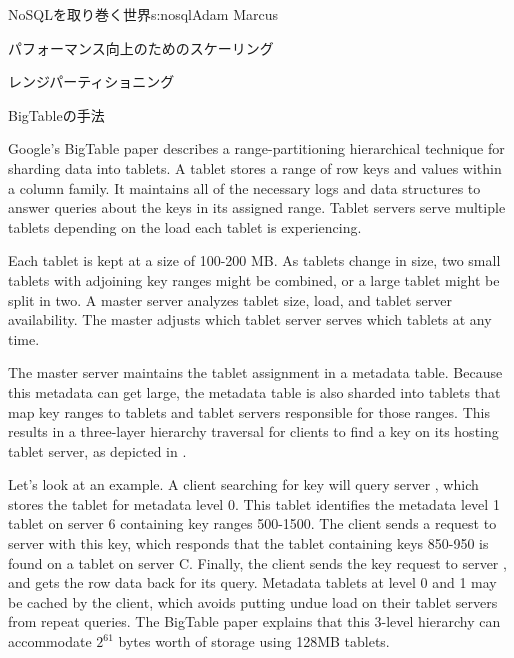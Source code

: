 \begin{aosachapter}{NoSQLを取り巻く世界}{s:nosql}{Adam Marcus}
\begin{aosasect1}{パフォーマンス向上のためのスケーリング}
\begin{aosasect2}{レンジパーティショニング}
\vspace{-0.1cm} %
\begin{aosasect3}{BigTableの手法}

Google's BigTable paper describes a range-partitioning hierarchical
technique for sharding data into tablets.  A tablet stores a range of
row keys and values within a column family.  It maintains all
of the necessary logs and data structures to answer queries about the
keys in its assigned range.  Tablet servers serve multiple tablets
depending on the load each tablet is experiencing.

Each tablet is kept at a size of 100-200 MB\@.  As tablets change in size, two 
small tablets with adjoining key ranges might be combined, or a large tablet might be
split in two.  A master server analyzes tablet size,
load, and tablet server availability.  The master adjusts which tablet
server serves which tablets at any time.


The master server maintains the tablet assignment in a metadata table.
Because this metadata can get large, the metadata table is also
sharded into tablets that map key ranges to tablets and tablet servers
responsible for those ranges.  This results in a three-layer hierarchy
traversal for clients to find a key on its hosting tablet server,
as depicted in .

Let's look at an example.  A client searching for key
 will query server , which stores the tablet for
metadata level 0.  This tablet identifies the metadata level 1 tablet
on server 6 containing key ranges 500-1500.  The client sends a
request to server  with this key, which responds that the
tablet containing keys 850-950 is found on a tablet on server
C\@.  Finally, the client sends the key request to server , and
gets the row data back for its query.  Metadata tablets at level 0 and
1 may be cached by the client, which avoids putting undue load on
their tablet servers from repeat queries.  The BigTable paper explains
that this 3-level hierarchy can accommodate $2^{61}$ bytes worth of storage
using 128MB tablets.

\end{aosasect3}


\end{aosasect2}
\end{aosasect1}
\end{aosachapter}
